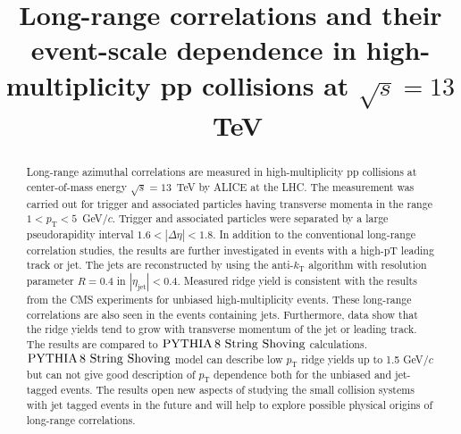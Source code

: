\documentclass[ALICE,manyauthors]{cernphprep}
\begin{document}
\begin{titlepage}

\PHyear{}
\PHdate{\today}
%

\title{Long-range correlations and their event-scale dependence in high-multiplicity pp collisions at $\sqrt{s} = 13$~TeV}


\begin{abstract}
%

Long-range azimuthal correlations are measured in high-multiplicity pp collisions at center-of-mass energy $\sqrt{s} = 13$~TeV by ALICE at the LHC. The measurement was carried out for trigger and associated particles having transverse momenta in the range $1 < p_{\mathrm T} < 5$~GeV/$c$. Trigger and associated particles were separated by a large pseudorapidity interval $1.6 < |\Delta \eta |<1.8$.
In addition to the conventional long-range correlation studies, the results are further investigated in events with a high-pT leading track or jet.
The jets are reconstructed by using the anti-$k_\mathrm{T}$ algorithm with resolution parameter $R=0.4$ in $|\eta_\mathrm{jet}|<0.4$. 
Measured ridge yield is consistent with the results from the CMS experiments for unbiased high-multiplicity events.
These long-range correlations are also seen in the events containing jets. Furthermore, data show that the ridge yields tend to grow with transverse momentum of the jet or leading track. %
The results are compared to ${\mathrm{PYTHIA}\,8~\mathrm{String}~}\mathrm{Shoving}$ calculations.  
${\mathrm{PYTHIA}\,8~\mathrm{String}~}\mathrm{Shoving}$ model can describe low $p_{\mathrm T}$ ridge yields up to 1.5 GeV/$c$ but can not give good description of $p_{\mathrm T}$ dependence both for the unbiased and jet-tagged events.
The results open new aspects of studying the small collision systems with jet tagged events in the future and will help to explore possible physical origins of long-range correlations.

\end{abstract}

\end{titlepage}
\end{document}

